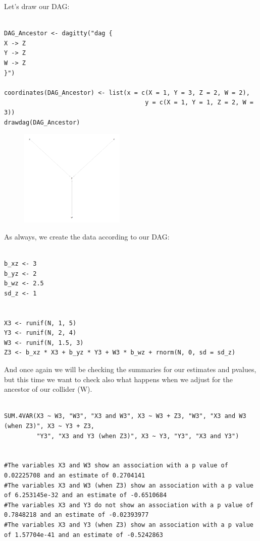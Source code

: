 \documentclass{article}
\begin{document}
Let's draw our DAG: 

\begin{lstlisting}

DAG_Ancestor <- dagitty("dag {
X -> Z
Y -> Z
W -> Z
}")

coordinates(DAG_Ancestor) <- list(x = c(X = 1, Y = 3, Z = 2, W = 2),
                                       y = c(X = 1, Y = 1, Z = 2, W = 3))
drawdag(DAG_Ancestor)

\end{lstlisting}


\begin{figure}[h]
\includegraphics[width=5cm]{DAG_ANCESTOR.png}
\centering
\end{figure}


As always, we create the data according to our DAG:

\begin{lstlisting}

b_xz <- 3 
b_yz <- 2
b_wz <- 2.5
sd_z <- 1


X3 <- runif(N, 1, 5)
Y3 <- runif(N, 2, 4)
W3 <- runif(N, 1.5, 3)
Z3 <- b_xz * X3 + b_yz * Y3 + W3 * b_wz + rnorm(N, 0, sd = sd_z)

\end{lstlisting}


And once again we will be checking the summaries for our estimates and pvalues, but this time we want to check also what happens when we adjust for the ancestor of our collider (W).


\begin{lstlisting}

SUM.4VAR(X3 ~ W3, "W3", "X3 and W3", X3 ~ W3 + Z3, "W3", "X3 and W3 (when Z3)", X3 ~ Y3 + Z3, 
         "Y3", "X3 and Y3 (when Z3)", X3 ~ Y3, "Y3", "X3 and Y3")


#The variables X3 and W3 show an association with a p value of 0.02225708 and an estimate of 0.2704141 
#The variables X3 and W3 (when Z3) show an association with a p value of 6.253145e-32 and an estimate of -0.6510684 
#The variables X3 and Y3 do not show an association with a p value of 0.7848218 and an estimate of -0.02393977 
#The variables X3 and Y3 (when Z3) show an association with a p value of 1.57704e-41 and an estimate of -0.5242863 
\end{lstlisting}
\end{document}
